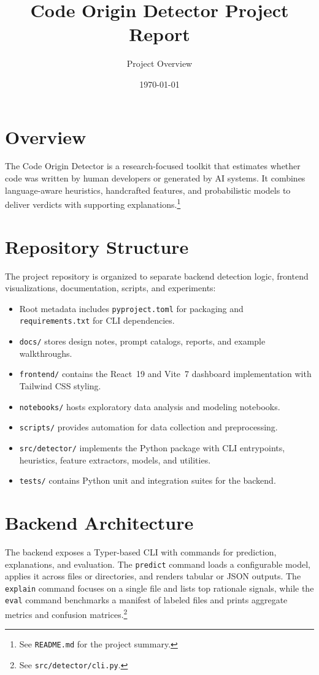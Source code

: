\documentclass[11pt]{article}
\title{Code Origin Detector Project Report}
\author{Project Overview}
\date{\today}
\begin{document}
\maketitle
\tableofcontents
\newpage

\section{Overview}
\label{sec:overview}
The Code Origin Detector is a research-focused toolkit that estimates whether code was written by human developers or generated by AI systems. It combines language-aware heuristics, handcrafted features, and probabilistic models to deliver verdicts with supporting explanations.\footnote{See \texttt{README.md} for the project summary.}

\section{Repository Structure}
\label{sec:structure}
The project repository is organized to separate backend detection logic, frontend visualizations, documentation, scripts, and experiments:
\begin{itemize}[leftmargin=*]
  \item Root metadata includes \texttt{pyproject.toml} for packaging and \texttt{requirements.txt} for CLI dependencies.
  \item \texttt{docs/} stores design notes, prompt catalogs, reports, and example walkthroughs.
  \item \texttt{frontend/} contains the React~19 and Vite~7 dashboard implementation with Tailwind CSS styling.
  \item \texttt{notebooks/} hosts exploratory data analysis and modeling notebooks.
  \item \texttt{scripts/} provides automation for data collection and preprocessing.
  \item \texttt{src/detector/} implements the Python package with CLI entrypoints, heuristics, feature extractors, models, and utilities.
  \item \texttt{tests/} contains Python unit and integration suites for the backend.
\end{itemize}

\section{Backend Architecture}
\label{sec:backend}
The backend exposes a Typer-based CLI with commands for prediction, explanations, and evaluation. The \texttt{predict} command loads a configurable model, applies it across files or directories, and renders tabular or JSON outputs. The \texttt{explain} command focuses on a single file and lists top rationale signals, while the \texttt{eval} command benchmarks a manifest of labeled files and prints aggregate metrics and confusion matrices.\footnote{See \texttt{src/detector/cli.py}.}
\end{document}
